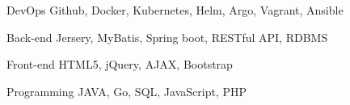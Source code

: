 

\begin{cvskills}

  \cvskill
    {DevOps} %
    {Github, Docker, Kubernetes, Helm, Argo, Vagrant, Ansible} %

  \cvskill
    {Back-end} %
    {Jersery, MyBatis, Spring boot, RESTful API, RDBMS} %

  \cvskill
    {Front-end} %
    {HTML5, jQuery, AJAX, Bootstrap} %

  \cvskill
    {Programming} %
    {JAVA, Go, SQL, JavaScript, PHP} %


\end{cvskills}
